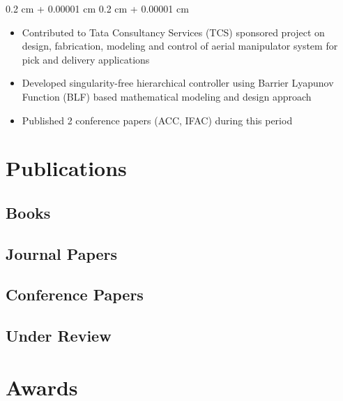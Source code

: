 \documentclass[10pt, letterpaper]{article}
\newenvironment{highlights}{
    \begin{itemize}[
        topsep=0.10 cm,
        parsep=0.10 cm,
        partopsep=0pt,
        itemsep=0pt,
        leftmargin=0.4 cm + 10pt
    ]
}{
    \end{itemize}
} %
\newenvironment{onecolentry}{
    \begin{adjustwidth}{
        0.2 cm + 0.00001 cm
    }{
        0.2 cm + 0.00001 cm
    }
}{
    \end{adjustwidth}
} %
\begin{document}
        \vspace{0.05 cm}
        \begin{onecolentry}
            \begin{highlights}
                \setlength{\itemsep}{0pt}
                \item Contributed to Tata Consultancy Services (TCS) sponsored project on design, fabrication, modeling and control of aerial manipulator system for pick and delivery applications
                \item Developed singularity-free hierarchical controller using Barrier Lyapunov Function (BLF) based mathematical modeling and design approach
                \item Published 2 conference papers (ACC, IFAC) during this period
            \end{highlights}
        \end{onecolentry}


\section{Publications}

\nocite{*}

\subsection*{Books}
\printbibliography[type=book, heading=none]

\subsection*{Journal Papers}
\printbibliography[type=article, heading=none, nottype=inproceedings, nottype=book, notkeyword=underreview]

\subsection*{Conference Papers}
\printbibliography[type=inproceedings, heading=none]

\subsection*{Under Review}
\printbibliography[keyword=underreview, heading=none, resetnumbers=false]

\section{Awards}
\end{document}

